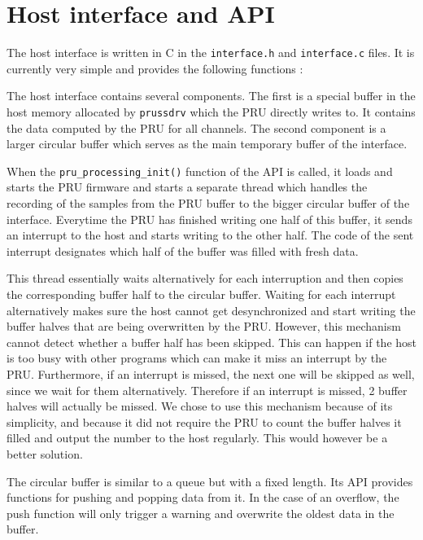 \documentclass[]{report}
\begin{document}
\hypertarget{host-interface-and-api}{%
\section{Host interface and API}\label{host-interface-and-api}}

The host interface is written in C in the \texttt{interface.h} and
\texttt{interface.c} files. It is currently very simple and provides the
following functions :




The host interface contains several components. The first is a special buffer in the host memory allocated by \texttt{prussdrv} which the PRU directly writes to. It contains the data computed by the PRU for all channels. The second component is a larger circular buffer which serves as the main temporary buffer of the interface.

When the \texttt{pru\_processing\_init()} function of the API is called, it loads and starts the PRU firmware and starts a separate thread which handles the recording of the samples from the PRU buffer to the bigger circular buffer of the interface. Everytime the PRU has finished writing one half of this buffer, it sends an interrupt to the host and starts writing to the other half. The code of the sent interrupt designates which half of the buffer was filled with fresh data.

This thread essentially waits alternatively for each interruption and then copies the corresponding buffer half to the circular buffer. Waiting for each interrupt alternatively makes sure the host cannot get desynchronized and start writing the buffer halves that are being overwritten by the PRU. However, this mechanism cannot detect whether a buffer half has been skipped. This can happen if the host is too busy with other programs which can make it miss an interrupt by the PRU. Furthermore, if an interrupt is missed, the next one will be skipped as well, since we wait for them alternatively. Therefore if an interrupt is missed, 2 buffer halves will actually be missed. We chose to use this mechanism because of its simplicity, and because it did not require the PRU to count the buffer halves it filled and output the number to the host regularly. This would however be a better solution.

The circular buffer is similar to a queue but with a fixed length. Its API provides functions for pushing and popping data from it. In the case of an overflow, the push function will only trigger a warning and overwrite the oldest data in the buffer.
\end{document}
